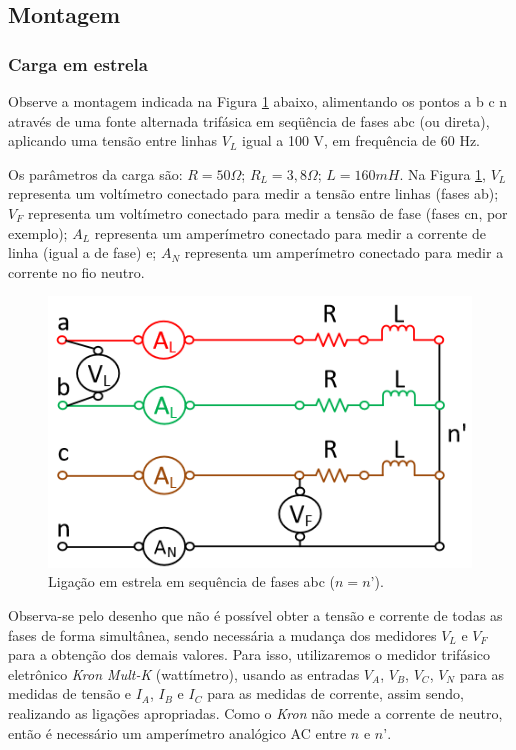 \documentclass[a4paper,12pt,oneside,openany,table,xcdraw]{article}
\begin{document}
\subsection{Montagem} %

\subsubsection{Carga em estrela}
Observe a montagem indicada na Figura \ref{fig1} abaixo, alimentando os pontos a b c n através de uma fonte alternada trifásica em seqüência de fases abc (ou direta), aplicando uma tensão entre linhas $V_L$ igual a 100 V, em frequência de 60 Hz.

Os parâmetros da carga são: $R = 50\Omega$; $R_L = 3,8 \Omega$; $L = 160 mH$. Na Figura \ref{fig1}, $V_L$ representa um voltímetro conectado para medir a tensão entre linhas (fases ab); $V_F$ representa um voltímetro conectado para medir a tensão de fase (fases cn, por exemplo); $A_L$ representa um amperímetro conectado para medir a corrente de linha (igual a de fase) e; $A_N$ representa um amperímetro conectado para medir a corrente no fio neutro. 
\begin{figure}[H]
\centering
\captionsetup{font=scriptsize}
\includegraphics[width=14cm]{fig1}
\caption{Ligação em estrela em sequência de fases abc ($n = n’$).}
\label{fig1}
\end{figure}
Observa-se pelo desenho que não é possível obter a tensão e corrente de todas as fases de forma simultânea, sendo necessária a mudança dos medidores $V_L$ e $V_F$ para a obtenção dos demais valores. Para isso, utilizaremos o medidor trifásico eletrônico \textit{Kron Mult-K} (wattímetro),  usando as entradas $V_A$, $V_B$, $V_C$, $V_N$ para as medidas de tensão e $I_A$, $I_B$ e $I_C$ para as medidas de corrente, assim sendo, realizando as ligações apropriadas. Como o \textit{Kron} não mede a corrente de neutro, então é necessário um amperímetro analógico AC entre $n$ e $n’$.
\end{document}
